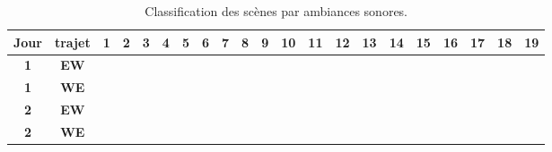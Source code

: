 \begin{table}[t]
\caption{Classification des scènes par ambiances sonores.}
\centering
\begin{tabular}{|c|c|*{19}{l|}}
\hline
\multicolumn{1}{|l|}{\textbf{Jour}} & \textbf{trajet}   & 1                        & 2                        & 3                        & 4                        & 5                        & 6                        & 7                        & 8                        & 9                        & 10                       & 11                       & 12                       & 13                       & 14                       & 15                       & 16                       & 17                       & 18                       & 19                       \\ \hline
\textbf{1} & \textbf{EW} & \cellcolor[HTML]{F56B00} & \cellcolor[HTML]{F56B00} & \cellcolor[HTML]{5AB25A} & \cellcolor[HTML]{FFCB2F} & \cellcolor[HTML]{FFCB2F} & \cellcolor[HTML]{F56B00} & \cellcolor[HTML]{FFCB2F} & \cellcolor[HTML]{5AB25A} & \cellcolor[HTML]{F56B00} & \cellcolor[HTML]{5AB25A} & \cellcolor[HTML]{FFCB2F} & \cellcolor[HTML]{F56B00} & \cellcolor[HTML]{FFCB2F} & \cellcolor[HTML]{FFCB2F} & \cellcolor[HTML]{F56B00} & \cellcolor[HTML]{9A0000} & \cellcolor[HTML]{FFCB2F} & \cellcolor[HTML]{F56B00} & \cellcolor[HTML]{5AB25A} \\ \hline
\textbf{1}  & \textbf{WE} & \cellcolor[HTML]{F56B00} & \cellcolor[HTML]{F56B00} &                          & \cellcolor[HTML]{FFCB2F} & \cellcolor[HTML]{FFCB2F} & \cellcolor[HTML]{FFCB2F} & \cellcolor[HTML]{FFCB2F} & \cellcolor[HTML]{FFCB2F} & \cellcolor[HTML]{F56B00} & \cellcolor[HTML]{F56B00} & \cellcolor[HTML]{FFCB2F} & \cellcolor[HTML]{F56B00} & \cellcolor[HTML]{FFCB2F} & \cellcolor[HTML]{FFCB2F} & \cellcolor[HTML]{9A0000} & \cellcolor[HTML]{9A0000} & \cellcolor[HTML]{FFCB2F} & \cellcolor[HTML]{F56B00} &  \\ \hline
\textbf{2} & \textbf{EW} & \cellcolor[HTML]{F56B00} & \cellcolor[HTML]{F56B00} & \cellcolor[HTML]{5AB25A} & \cellcolor[HTML]{FFCB2F} & \cellcolor[HTML]{FFCB2F} & \cellcolor[HTML]{FFCB2F} & \cellcolor[HTML]{FFCB2F} & \cellcolor[HTML]{FFCB2F} & \cellcolor[HTML]{F56B00} & \cellcolor[HTML]{F56B00} & \cellcolor[HTML]{FFCB2F} & \cellcolor[HTML]{F56B00} & \cellcolor[HTML]{FFCB2F} & \cellcolor[HTML]{F56B00} & \cellcolor[HTML]{9A0000} & \cellcolor[HTML]{9A0000} & \cellcolor[HTML]{FFCB2F} & \cellcolor[HTML]{F56B00} & \cellcolor[HTML]{5AB25A} \\ \hline
\textbf{2} & \textbf{WE} & \cellcolor[HTML]{F56B00} & \cellcolor[HTML]{F56B00} & \cellcolor[HTML]{5AB25A} & \cellcolor[HTML]{FFCB2F} & \cellcolor[HTML]{FFCB2F} & \cellcolor[HTML]{FFCB2F} & \cellcolor[HTML]{FFCB2F} & \cellcolor[HTML]{FFCB2F} & \cellcolor[HTML]{F56B00} & \cellcolor[HTML]{FFCB2F} & \cellcolor[HTML]{FFCB2F} & \cellcolor[HTML]{FFCB2F} & \cellcolor[HTML]{FFCB2F} & \cellcolor[HTML]{FFCB2F} & \cellcolor[HTML]{9A0000} & \cellcolor[HTML]{9A0000} & \cellcolor[HTML]{FFCB2F} & \cellcolor[HTML]{9A0000} & \cellcolor[HTML]{5AB25A} \\ \hline
\end{tabular}


\end{table}
